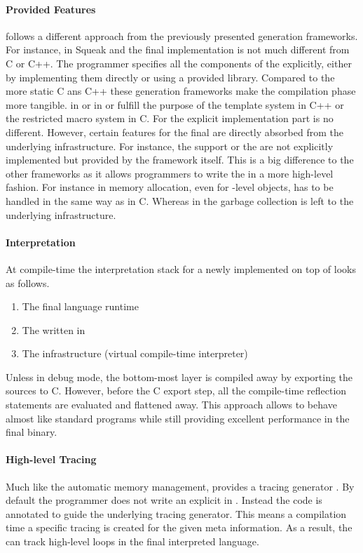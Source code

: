 \paragraph{Provided \VM Features}
\PyPy follows a different approach from the previously presented \VM generation frameworks.
For instance, in Squeak and \Jikes the final \VM implementation is not much different from C or C++.
The programmer specifies all the components of the \VM explicitly, either by implementing them directly or using a provided library.
Compared to the more static C ans C++ these \VM generation frameworks make the compilation phase more tangible.
\ST in \Squeak or \Java in \Jikes or \Maxine fulfill the purpose of the template system in C++ or the restricted macro system in C.
For the explicit implementation part \PyPy is no different.
However, certain features for the final \VM are directly absorbed from the underlying \PyPy infrastructure.
For instance, the \JIT support or the \GC are not explicitly implemented but provided by the \PyPy framework itself.
This is a big difference to the other \VM frameworks as it allows programmers to write the \VM in a more high-level fashion.
For instance in \Squeak memory allocation, even for \VM-level objects, has to be handled in the same way as in C.
Whereas in \PyPy the garbage collection is left to the underlying infrastructure.

\paragraph{\RPython Interpretation}
At compile-time the interpretation stack for a newly implemented \VM on top of \PyPy looks as follows.
%
\begin{enumerate}
\item The final language runtime
\item The \VM written in \RPython
\item The \PyPy infrastructure (virtual compile-time \RPython interpreter)
\end{enumerate}
%
Unless in debug mode, the bottom-most layer is compiled away by exporting the \RPython sources to C.
However, before the C export step, all the compile-time reflection statements are evaluated and flattened away.
This approach allows \RPython \VMs to behave almost like standard \Python programs while still providing excellent performance in the final \VM binary.

\paragraph{High-level Tracing \JIT}
Much like the automatic memory management, \PyPy provides a tracing \JIT generator \cite{Bolz09a}.
By default the \VM programmer does not write an explicit \JIT in \PyPy.
Instead the \VM code is annotated to guide the underlying tracing \JIT generator.
This means a \VM compilation time a specific tracing \JIT is created for the given meta information.
As a result, the \JIT can track high-level loops in the final interpreted language.


